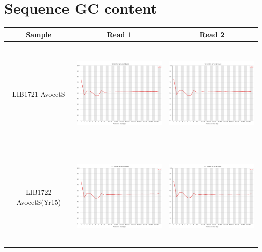 \section{Sequence GC content}
 \label{App:AppendixQCGC}
\begin{center}
\begin{tabular}{ccc}
\toprule
Sample  & Read 1 & Read 2 \\ \midrule 
\\
\begin{sideways}LIB1721 AvocetS\end{sideways} & \includegraphics[height=5cm]{Appendices/images/Sample_LIB1721_base_gc_R1.png} & \includegraphics[height=5cm]{Appendices/images/Sample_LIB1721_base_gc_R2.png} \\ \midrule  \\
\begin{sideways}LIB1722 AvocetS(Yr15)\end{sideways} & \includegraphics[height=5cm]{Appendices/images/Sample_LIB1722_base_gc_R1.png} & \includegraphics[height=5cm]{Appendices/images/Sample_LIB1722_base_gc_R2.png} \\   


\end{tabular}
\end{center}
